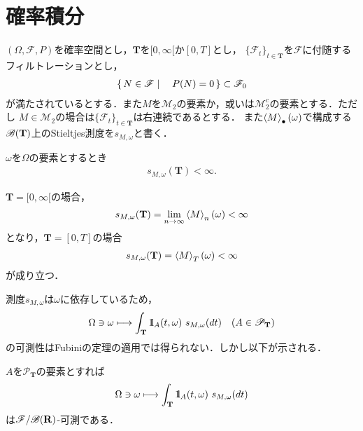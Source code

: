 \section{確率積分}
	$(\Omega,\mathscr{F},P)$を確率空間とし，$\mathbf{T}$を$[0,\infty[$か$[0,T]$とし，
	$\{\mathscr{F}_t\}_{t \in \mathbf{T}}$を$\mathscr{F}$に付随するフィルトレーションとし，
	\begin{align}
		\left\{\, N \in \mathscr{F} \mid \quad P(N) = 0\, \right\} \subset \mathscr{F}_0
	\end{align}
	が満たされているとする．また$M$を$\mathscr{M}_2$の要素か，或いは$\mathscr{M}_2^c$の要素とする．ただし
	$M \in \mathscr{M}_2$の場合は$\{\mathscr{F}_t\}_{t \in \mathbf{T}}$は右連続であるとする．
	また$\inprod<M>_\bullet(\omega)$で構成する$\mathscr{B}(\mathbf{T})$上のStieltjes測度を$s_{M,\omega}$と書く．
	
	\begin{screen}
		\begin{thm}
			$\omega$を$\Omega$の要素とするとき
			\begin{align}
				s_{M,\omega}(\mathbf{T}) < \infty.
			\end{align}
		\end{thm}
	\end{screen}
	
	\begin{prf}
		$\mathbf{T} = [0,\infty[$の場合，
		\begin{align}
			s_{M,\omega}(\mathbf{T}) = \lim_{n \to \infty} \inprod<M>_n(\omega) < \infty
		\end{align}
		となり，$\mathbf{T} = [0,T]$の場合
		\begin{align}
			s_{M,\omega}(\mathbf{T}) = \inprod<M>_T(\omega) < \infty
		\end{align}
		が成り立つ．
		\QED
	\end{prf}
	
	測度$s_{M,\omega}$は$\omega$に依存しているため，
	\begin{align}
		\Omega \ni \omega \longmapsto \int_{\mathbf{T}} \mbox{1}\hspace{-0.25em}\mbox{l}_A(t,\omega)\ s_{M,\omega}(dt)
		\quad (A \in \mathscr{P}_{\mathbf{T}})
	\end{align}
	の可測性はFubiniの定理の適用では得られない．しかし以下が示される．
	
	\begin{screen}
		\begin{thm}
			$A$を$\mathscr{P}_{\mathbf{T}}$の要素とすれば
			\begin{align}
				\Omega \ni \omega \longmapsto \int_{\mathbf{T}} \mbox{1}\hspace{-0.25em}\mbox{l}_A(t,\omega)\ s_{M,\omega}(dt)
			\end{align}
			は$\mathscr{F}/\mathscr{B}(\mathbf{R})$-可測である．
		\end{thm}
	\end{screen}
	

